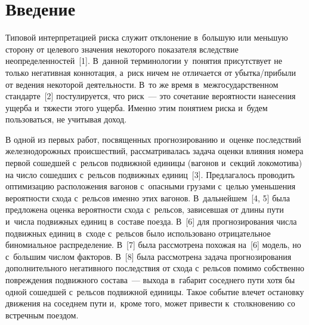 \begin{multicols}{2}

\label{st\stat}
      
\section{Введение}

    Типовой интерпретацией риска служит отклонение в~большую или 
меньшую сторону от целевого значения некоторого показателя вследствие 
неопределенностей~[1]. В~данной терминологии у~поня\-тия присутствует не 
только негативная коннотация, а~риск ничем не отличается от 
 убыт\-ка/при\-бы\-ли от ведения некоторой де\-я\-тель\-ности. В~то же время 
 в~межгосударственном стандарте~[2] постулируется, что риск~--- это сочетание 
ве\-ро\-ят\-ности нанесения ущер\-ба и~тя\-жести этого ущерба. Именно этим понятием 
рис\-ка и~будем пользоваться, не учитывая доход.

    В одной из первых работ, посвященных прогнозированию и~оценке 
по\-след\-ст\-вий железнодорожных происшествий, рас\-смат\-ри\-ва\-лась задача оценки 
влияния номера первой сошедшей с~рельсов по\-движ\-ной единицы (вагонов 
и~секций локомотива) на чис\-ло сошедших с~рельсов подвижных единиц~[3]. 
Предлагалось проводить оптимизацию расположения вагонов с~опас\-ны\-ми грузами 
с~\mbox{целью} уменьшения ве\-ро\-ят\-ности схода с~рельсов именно этих вагонов. 
В~дальнейшем~[4, 5] была предложена оценка ве\-ро\-ят\-ности схода с~рельсов, 
зависевшая от длины пути и~чис\-ла по\-движ\-ных единиц в~со\-ста\-ве поезда. В~[6] для 
прогнозирования чис\-ла по\-движ\-ных единиц в~сходе с~рельсов было использовано 
отрицательное биномиальное распределение. В~[7] была рас\-смот\-ре\-на похожая 
на~[6] модель, но с~б$\acute{\mbox{о}}$льшим числом факторов. В~[8] была 
рассмотрена задача прогнозирования дополнительного негативного последствия 
от схода с~рельсов помимо собственно повреждения подвижного со\-ста\-ва~--- 
выхода в~габарит соседнего пути хотя бы одной сошедшей с~рельсов по\-движ\-ной 
единицы. Такое событие влечет остановку движения на соседнем пути и,~кроме 
того, может привести к~столкновению со встречным поездом. 


\end{multicols}
